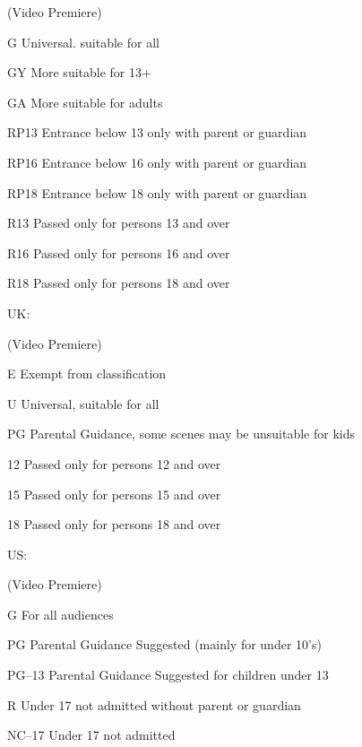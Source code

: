 \vspace{2mm}
\begin{Ventry}{(Video Premiere)}
\item[G]     Universal. suitable for all
\item[GY]     More suitable for 13+
\item[GA]     More suitable for adults
\item[RP13]     Entrance below 13 only with parent or guardian
\item[RP16]     Entrance below 16 only with parent or guardian
\item[RP18]     Entrance below 18 only with parent or guardian
\item[R13]     Passed only for persons 13 and over
\item[R16]     Passed only for persons 16 and over
\item[R18]     Passed only for persons 18 and over
\end{Ventry}

\vspace{4mm}            

UK:
\nopagebreak

\vspace{2mm}
\begin{Ventry}{(Video Premiere)}
\item[E]      Exempt from classification
\item[U]      Universal, suitable for all
\item[PG]     Parental Guidance, some scenes may be unsuitable for kids
\item[12]     Passed only for persons 12 and over
\item[15]     Passed only for persons 15 and over
\item[18]     Passed only for persons 18 and over
\end{Ventry}

\vspace{4mm} 

US:   
\nopagebreak

\vspace{2mm}
\begin{Ventry}{(Video Premiere)}
\item[G]      For all audiences
\item[PG]     Parental Guidance Suggested (mainly for under 10's)
\item[PG--13]     Parental Guidance Suggested for children under 13
\item[R]      Under 17 not admitted without parent or guardian
\item[NC--17]     Under 17 not admitted
\end{Ventry}

